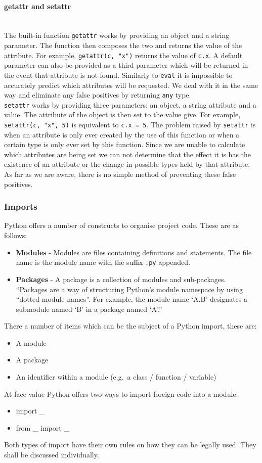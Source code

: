 \documentclass[12pt, titlepage]{article}
\begin{document}
\paragraph*{getattr and setattr}\mbox{} \\
The built-in function \texttt{getattr} works by providing an object and a string parameter. The function then composes the two and returns the value of the attribute. For example, \texttt{getattr(c, "x")} returns the value of \texttt{c.x}. A default parameter can also be provided as a third parameter which will be returned in the event that attribute is not found. Similarly to \texttt{eval} it is impossible to accurately predict which attributes will be requested. We deal with it in the same way and eliminate any false positives by returning \texttt{any} type. \\
\indent \texttt{setattr} works by providing three parameters: an object, a string attribute and a value. The attribute of the object is then set to the value give. For example, \texttt{setattr(c, "x", 5)} is equivalent to \texttt{c.x = 5}. The problem raised by \texttt{setattr} is when an attribute is only ever created by the use of this function or when a certain type is only ever set by this function. Since we are unable to calculate which attributes are being set we can not determine that the effect it is has the existence of an attribute or the change in possible types held by that attribute. As far as we are aware, there is no simple method of preventing these false positives.

\subsubsection{Imports}
Python offers a number of constructs to organise project code. These are as follows:
\begin{itemize}
	\item \textbf{Modules} - Modules are files containing definitions and statements. The file name is the module name with the suffix \texttt{.py} appended.~\cite{pythonImports}
	\item \textbf{Packages} - A package is a collection of modules and sub-packages. ``Packages are a way of structuring Python's module namespace by using ``dotted module names''. For example, the module name `A.B' designates a submodule named `B' in a package named `A'.''
\end{itemize}
There a number of items which can be the subject of a Python import, these are:
\begin{itemize}
	\item A module
	\item A package
	\item An identifier within a module (e.g.\ a class / function / variable)
\end{itemize}
At face value Python offers two ways to import foreign code into a module:
\begin{itemize}
	\item import \_
	\item from \_ import \_
\end{itemize}
Both types of import have their own rules on how they can be legally used. They shall be discussed individually.
\end{document}
